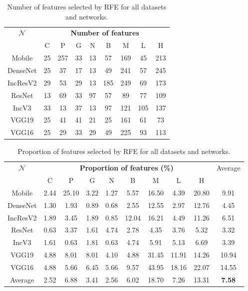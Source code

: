 \begin{table}
     \center 
     \begin{tabular}{|c|cccccccc|}
         \hline
         \multirow{2}{*}{$\mathcal{N}$} & \multicolumn{8}{c|}{\textbf{Number of features}} \\
         \cline{2-9}
         & C & P & G & N & B & M & L & H \\ 
         \hline
         Mobile & 25 & 257 & 33 & 13 & 57 & 169 & 45 & 213 \\
         DenseNet & 25 & 37 & 17 & 13 & 49 & 241 & 57 & 245 \\
         IncResV2 & 29 & 53 & 29 & 13 & 185 & 249 & 69 & 173 \\
         ResNet & 13 & 69 & 33 & 97 & 57 & 89 & 77 & 109 \\
         IncV3 & 33 & 13 & 37 & 13 & 97 & 121 & 105 & 137 \\
         VGG19 & 25 & 41 & 41 & 21 & 25 & 161 & 61 & 73 \\
         VGG16 & 25 & 29 & 33 & 29 & 49 & 225 & 93 & 113 \\
         \hline
         
     \end{tabular}
     \caption{Number of features selected by RFE for all datasets and networks.}
     \label{app:comp:tab:rfe_selected}
 \end{table}
 
 \begin{table}
     \center 
     \begin{tabular}{|c|cccccccc|c|}
         \hline
         \multirow{2}{*}{$\mathcal{N}$} & \multicolumn{8}{c|}{\textbf{Proportion of features (\%)}} & \multirow{2}{*}{Average}\\
         \cline{2-9}
         & C & P & G & N & B & M & L & H & \\ 
         \hline
         Mobile & 2.44 & 25.10 & 3.22 & 1.27 & 5.57 & 16.50 & 4.39 & 20.80 & 9.91 \\
         DenseNet & 1.30 & 1.93 & 0.89 & 0.68 & 2.55 & 12.55 & 2.97 & 12.76 & 4.45 \\
         IncResV2 & 1.89 & 3.45 & 1.89 & 0.85 & 12.04 & 16.21 & 4.49 & 11.26 & 6.51 \\
         ResNet & 0.63 & 3.37 & 1.61 & 4.74 & 2.78 & 4.35 & 3.76 & 5.32 & 3.32 \\
         IncV3 & 1.61 & 0.63 & 1.81 & 0.63 & 4.74 & 5.91 & 5.13 & 6.69 & 3.39 \\
         VGG19 & 4.88 & 8.01 & 8.01 & 4.10 & 4.88 & 31.45 & 11.91 & 14.26 & 10.94 \\
         VGG16 & 4.88 & 5.66 & 6.45 & 5.66 & 9.57 & 43.95 & 18.16 & 22.07 & 14.55 \\
         \hline
         Average & 2.52 & 6.88 & 3.41 & 2.56 & 6.02 & 18.70 & 7.26 & 13.31 & \textbf{7.58} \\
         \hline
     \end{tabular}
     \caption{Proportion of features selected by RFE for all datasets and networks.}
     \label{app:comp:tab:rfe_selected_prop}
 \end{table}
 
